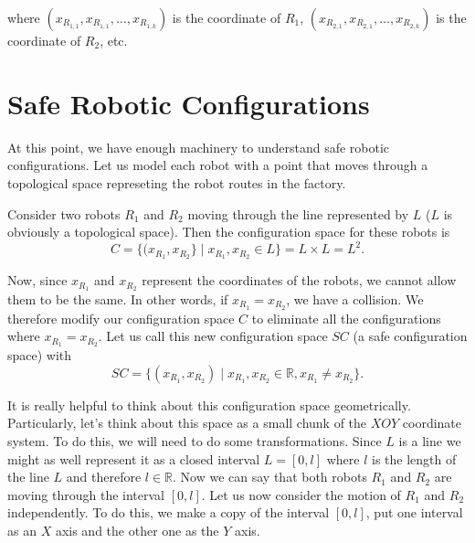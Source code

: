 \documentclass[12pt]{article}
\newcommand{\reals}{\mathbb{R}}                           %
\theoremstyle{definition}
\begin{document}
where $(x_{R_{1, 1}}, x_{R_{1, 1}}, \dots, x_{R_{1, k}})$ is the coordinate of $R_1$, $(x_{R_{2, 1}}, x_{R_{2, 1}}, \dots, x_{R_{2, k}})$ is the coordinate of $R_2$, etc.


\section*{\centering Safe Robotic Configurations}

At this point, we have enough machinery to understand safe robotic configurations.
Let us model each robot with a point that moves through a topological space represeting
the robot routes in the factory.

\bigskip

Consider two robots $R_1$ and $R_2$ moving through the line represented by $L$ ($L$ is obviously a topological space).
Then the configuration space for these robots is
$$C = \{(x_{R_1}, x_{R_2}\} \mid x_{R_1}, x_{R_2} \in L\} = L \times L = L^2.$$

\bigskip

Now, since $x_{R_1}$ and $x_{R_2}$ represent the coordinates of the robots, we cannot allow them to be the same.
In other words, if $x_{R_1} = x_{R_2}$, we have a collision. We therefore modify our configuration space $C$
to eliminate all the configurations where $x_{R_1} = x_{R_2}$. Let us call this new configuration space $SC$
(a safe configuration space) with
$$SC = \{(x_{R_1}, x_{R_2}) \mid x_{R_1}, x_{R_2} \in \reals, x_{R_1} \neq x_{R_2}\}.$$

\bigskip

It is really helpful to think about this configuration space geometrically.
Particularly, let's think about this space as a small chunk of the $XOY$ coordinate system.
To do this, we will need to do some transformations. Since $L$ is a line we might as well
represent it as a closed interval $L = [0, l]$ where $l$ is the length of the line $L$ and therefore
$l \in \reals$. Now we can say that both robots $R_1$ and $R_2$ are moving through the interval $[0, l]$.
Let us now consider the motion of $R_1$ and $R_2$ independently. To do this, we make a copy
of the interval $[0, l]$, put one interval as an $X$ axis and the other one as the $Y$ axis.
\end{document}
